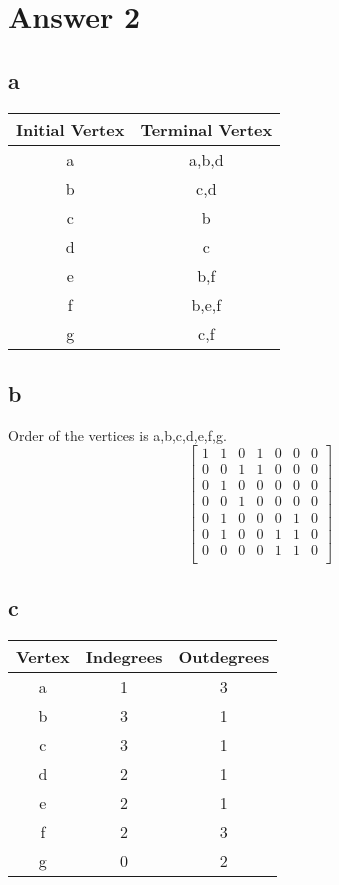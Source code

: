 \documentclass[11pt]{article}
\begin{document}
\section*{Answer 2}
\subsection*{a}
\begin{table}[H]
\small
\centering
\begin{tabular}
{|c|c|}	%
\hline
Initial Vertex & Terminal Vertex \\
\hline
a & a,b,d\\
b & c,d\\
c & b\\
d & c\\
e & b,f\\
f & b,e,f\\
g & c,f\\
\hline

\end{tabular}
\end{table}
\subsection*{b}
Order of the vertices is a,b,c,d,e,f,g.
$$
\begin{bmatrix}
1 & 1 & 0 & 1 & 0 & 0 & 0 \\
0 & 0 & 1 & 1 & 0 & 0 & 0 \\
0 & 1 & 0 & 0 & 0 & 0 & 0 \\
0 & 0 & 1 & 0 & 0 & 0 & 0 \\
0 & 1 & 0 & 0 & 0 & 1 & 0 \\
0 & 1 & 0 & 0 & 1 & 1 & 0 \\
0 & 0 & 0 & 0 & 1 & 1 & 0 \\
\end{bmatrix}
$$
\subsection*{c}
\begin{table}[H]
\small
\centering
\begin{tabular}
{|c|c|c|}	%
\hline
Vertex & Indegrees & Outdegrees \\
\hline
a & 1 & 3\\
b & 3 & 1\\
c & 3 & 1\\
d & 2 & 1\\
e & 2 & 1\\
f & 2 & 3\\
g & 0 & 2\\
\hline

\end{tabular}
\end{table}
\end{document}
